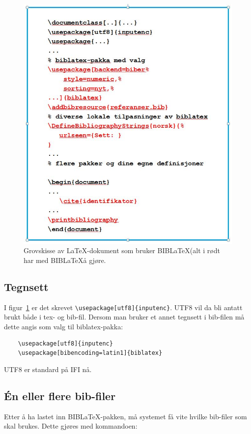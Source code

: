 \documentclass[11pt,norsk,a4paper]{article}
\newcommand{\blt}{B{\smaller[2]IB}\discretionary{-}{}{\kern
    -0.12em}\LaTeX{}}
\begin{document}
\begin{figure}
\begin{center}
\includegraphics[width=\textwidth]{./documentstructure.jpg}
\caption{Grovskisse av \LaTeX-dokument som bruker \blt (alt i rødt har med \blt å gjøre.}\label{document}
\end{center}
\end{figure}

\subsection{Tegnsett}
I figur~\ref{document} er det skrevet
\verb=\usepackage[utf8]{inputenc}=. UTF8 vil da bli antatt brukt både
i tex- og bib-fil. Dersom man bruker et annet tegnsett i bib-filen må
dette angis som valg til biblatex-pakka:

{\footnotesize\begin{verbatim}
    \usepackage[utf8]{inputenc}
    \usepackage[bibencoding=latin1]{biblatex}
\end{verbatim}}
\noindent{}UTF8 er standard på IFI nå.

\subsection{Én eller flere bib-filer}
Etter å ha lastet inn \blt{}-pakken, må systemet få vite hvilke
bib-filer som skal brukes. Dette gjøres med kommandoen:
\end{document}
